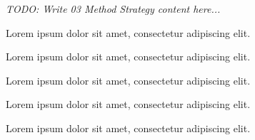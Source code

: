 \textit{TODO: Write 03 Method Strategy content here...}
\par Lorem ipsum dolor sit amet, consectetur adipiscing elit. \par Lorem ipsum dolor sit amet, consectetur adipiscing elit. \par Lorem ipsum dolor sit amet, consectetur adipiscing elit. \par Lorem ipsum dolor sit amet, consectetur adipiscing elit. \par Lorem ipsum dolor sit amet, consectetur adipiscing elit. 

